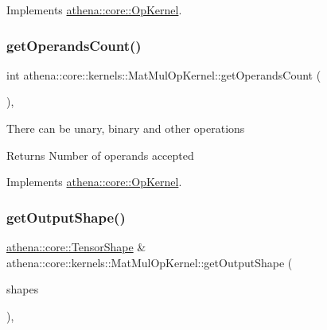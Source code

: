 Implements \mbox{\hyperlink{classathena_1_1core_1_1_op_kernel_ad95af6dd184ce7ee9182ec7ca54b6c4d}{athena\+::core\+::\+Op\+Kernel}}.

\mbox{\label{classathena_1_1core_1_1kernels_1_1_mat_mul_op_kernel_a75f9e43d1fcecaf9260af31c68cd69db}} 
\subsubsection{\texorpdfstring{get\+Operands\+Count()}{getOperandsCount()}}
{\footnotesize\ttfamily int athena\+::core\+::kernels\+::\+Mat\+Mul\+Op\+Kernel\+::get\+Operands\+Count (\begin{DoxyParamCaption}{ }\end{DoxyParamCaption})\hspace{0.3cm}{\ttfamily [override]}, {\ttfamily [virtual]}}

There can be unary, binary and other operations \begin{DoxyReturn}{Returns}
Number of operands accepted 
\end{DoxyReturn}


Implements \mbox{\hyperlink{classathena_1_1core_1_1_op_kernel_add97d4c132d80ecd9915acfedf7c9119}{athena\+::core\+::\+Op\+Kernel}}.

\mbox{\label{classathena_1_1core_1_1kernels_1_1_mat_mul_op_kernel_a3a397257c208f55ba5fba4018112a605}} 
\subsubsection{\texorpdfstring{get\+Output\+Shape()}{getOutputShape()}}
{\footnotesize\ttfamily \mbox{\hyperlink{classathena_1_1core_1_1_tensor_shape}{athena\+::core\+::\+Tensor\+Shape}} \& athena\+::core\+::kernels\+::\+Mat\+Mul\+Op\+Kernel\+::get\+Output\+Shape (\begin{DoxyParamCaption}\item[{std\+::vector$<$ \mbox{\hyperlink{classathena_1_1core_1_1_tensor_shape}{athena\+::core\+::\+Tensor\+Shape}} $>$ \&}]{shapes }\end{DoxyParamCaption})\hspace{0.3cm}{\ttfamily [override]}, {\ttfamily [virtual]}}

